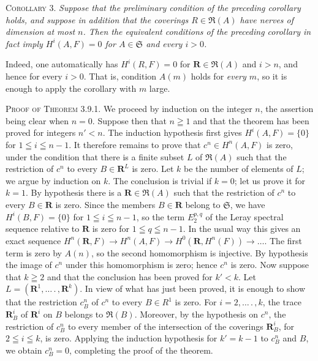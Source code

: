 
\textsc{Corollary 3.} \textit{Suppose that the preliminary condition
of the preceding corollary holds, and suppose in addition that the coverings
$R\in\mathfrak R(A)$ have nerves of dimension at most $n$. Then the
equivalent conditions of the preceding corollary in fact imply
$H^i(A,F)=0$ for $A\in\mathfrak S$ and every $i>0$.}

Indeed, one automatically has $H^i(R,F)=0$ for
$\mathbf R\in\mathfrak R(A)$ and $i>n$, and hence for every $i>0$. That is,
condition $A(m)$ holds for \emph{every $m$}, so it is enough to apply the corollary
with $m$ large.

\textsc{Proof of Theorem 3.9.1.} We proceed by induction on the
integer $n$, the assertion being clear when $n=0$. Suppose then that
$n\geqq1$ and that the theorem has been proved for integers $n'<n$. The
induction hypothesis first gives $H^i(A,F)=\{0\}$ for
$1\leqq i\leqq n-1$. It therefore remains to prove that
$c^n\in H^n(A,F)$ is zero, under the condition that there is a finite subset
$L$ of $\mathfrak R(A)$ such that the restriction of $c^n$ to every
$B\in\mathbf R^L$ is zero. Let $k$ be the number of elements of $L$; we
argue by induction on $k$. The conclusion is trivial if $k=0$; let us prove
it for $k=1$.
By hypothesis there is a $\mathbf R\in\mathfrak R(A)$ such that the
restriction of $c^n$ to every $B\in\mathbf R$ is zero. Since the members
$B\in\mathbf R$ belong to $\mathfrak S$, we have $H^i(B,F)=\{0\}$ for
$1\leqq i\leqq n-1$, so the term $E_2^{p,q}$ of the Leray spectral sequence
relative to $\mathbf R$ is zero for $1\leqq q\leqq n-1$. In the usual way this
gives an exact sequence
$H^n(\mathbf R,F)\to H^n(A,F)
\to H^0(\mathbf R,H^n(F))\to\ldots$.
The first term is zero by $A(n)$, so the second homomorphism is injective. By
hypothesis the image of $c^n$ under this homomorphism is zero; hence $c^n$ is
zero.
Now suppose that $k\geqq2$ and that the conclusion has been proved for
$k'<k$. Let $L=(\mathbf R^1,\ldots\mathpunct{.},\mathbf R^k)$. In view of what has just
been proved, it is enough to show that the restriction $c_B^n$ of $c^n$ to
every $B\in R^1$ is zero. For $i=2,\ldots\mathpunct{.},k$, the trace
$\mathbf R_B^i$ of $\mathbf R^i$ on $B$ belongs to $\mathfrak R(B)$.
Moreover, by the hypothesis on $c^n$, the restriction of $c_B^n$ to every
member of the intersection of the coverings $\mathbf R_B^i$, for
$2\leqq i\leqq k$, is zero. Applying the induction hypothesis for $k'=k-1$ to
$c_B^n$ and $B$, we obtain $c_B^n=0$, completing the proof of the theorem.

